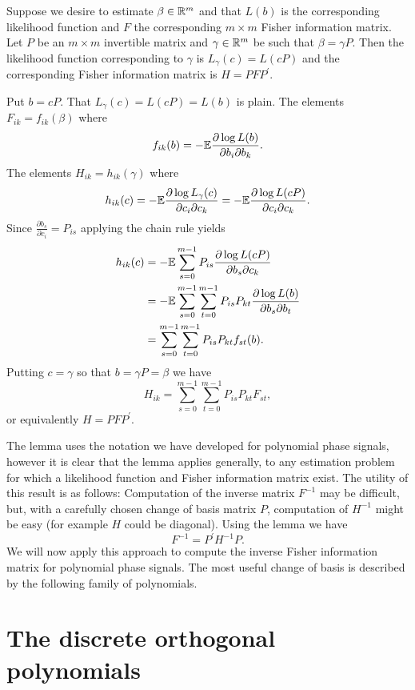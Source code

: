 \documentclass[journal,10pt]{IEEEtran}
\begin{document}
\begin{lemma}
Suppose we desire to estimate $\beta \in {\mathbb R}^m$ and that $L(b)$ is the corresponding likelihood function and $F$ the corresponding $m \times m$ Fisher information matrix.  Let $P$ be an $m \times m$ invertible matrix and $\gamma \in {\mathbb R}^m$ be such that $\beta = \gamma P$.  Then the likelihood function corresponding to $\gamma$ is $L_\gamma(c) = L(cP)$ and the corresponding Fisher information matrix is $H = P F P^\prime$. 
\end{lemma}
\begin{IEEEproof}
Put $b = cP$.  That $L_\gamma(c) = L(cP) = L(b)$ is plain.  The elements $F_{ik} = f_{ik}(\beta)$ where
\[
f_{ik}(b) = -{\mathbb E} \frac{\partial \log L(b)}{\partial b_i \partial b_k}.
\]
The elements $H_{ik} = h_{ik}(\gamma)$ where
\[
h_{ik}(c) = -{\mathbb E} \frac{\partial \log L_\gamma(c)}{\partial c_i \partial c_k} =  -{\mathbb E} \frac{\partial \log L(cP)}{\partial c_i \partial c_k}.
\]
Since $\frac{\partial b_s}{\partial c_i} = P_{is}$ applying the chain rule yields
\begin{align*}
h_{ik}(c) &= -{\mathbb E} \sum_{s=0}^{m-1} P_{is}\frac{\partial \log L(cP)}{\partial b_s \partial c_k} \\
&= -{\mathbb E} \sum_{s=0}^{m-1}\sum_{t=0}^{m-1} P_{is} P_{kt}   \frac{\partial \log L(b)}{\partial b_s \partial b_t} \\
&= \sum_{s=0}^{m-1}\sum_{t=0}^{m-1} P_{is} P_{kt}  f_{st}(b).
\end{align*}
Putting $c = \gamma$ so that $b = \gamma P = \beta$ we have
\[
H_{ik} = \sum_{s=0}^{m-1}\sum_{t=0}^{m-1} P_{is} P_{kt}  F_{st},
\]
or equivalently $H = P F P^\prime$.
\end{IEEEproof}

The lemma uses the notation we have developed for polynomial phase signals, however it is clear that the lemma applies generally, to any estimation problem for which a likelihood function and Fisher information matrix exist.  The utility of this result is as follows:  Computation of the inverse matrix $F^{-1}$ may be difficult, but, with a carefully chosen change of basis matrix $P$, computation of $H^{-1}$ might be easy (for example $H$ could be diagonal).  Using the lemma we have 
\[
F^{-1} = P^\prime H^{-1} P.
\]  
We will now apply this approach to compute the inverse Fisher information matrix for polynomial phase signals.  The most useful change of basis is described by the following family of polynomials.

\section{The discrete orthogonal polynomials}\label{sec:discr-orth-polyn}
\end{document}

